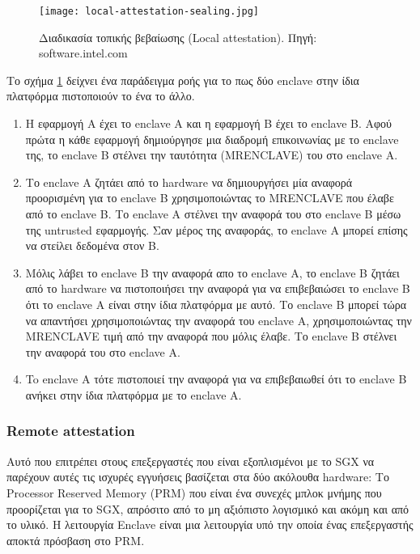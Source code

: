 \begin{figure}[H]
\centering
  \texttt{[image: local-attestation-sealing.jpg]}
  \caption{Διαδικασία τοπικής βεβαίωσης (Local attestation). Πηγή: software.intel.com }
  \label{fig:runtime_localattestation}
\end{figure}

Το σχήμα \ref{fig:runtime_localattestation} δείχνει ένα παράδειγμα ροής για το πως δύο enclave στην ίδια πλατφόρμα πιστοποιούν το ένα το άλλο. 
\begin{enumerate}
   \item Η εφαρμογή Α έχει το enclave A και η εφαρμογή Β έχει το enclave B. Αφού πρώτα η κάθε εφαρμογή δημιούργησε μια διαδρομή επικοινωνίας με το enclave της, το enclave B στέλνει την ταυτότητα (MRENCLAVE) του στο enclave A.
   \item Το enclave A ζητάει από το hardware να δημιουργήσει μία αναφορά προορισμένη για το enclave B χρησιμοποιώντας το MRENCLAVE που έλαβε από το enclave Β. Το enclave A στέλνει την αναφορά του στο enclave Β μέσω της untrusted εφαρμογής. Σαν μέρος της αναφοράς, το enclave Α μπορεί επίσης να στείλει δεδομένα στον Β.
\item Μόλις λάβει το enclave Β την αναφορά απο το enclave Α, το enclave Β ζητάει από το hardware να πιστοποιήσει την αναφορά για να επιβεβαιώσει το enclave Β ότι το enclave Α είναι στην ίδια πλατφόρμα με αυτό. Το enclave Β μπορεί τώρα να απαντήσει χρησιμοποιώντας την αναφορά του enclave Α, χρησιμοποιώντας την MRENCLAVE τιμή από την αναφορά που μόλις έλαβε. Το enclave B στέλνει την αναφορά του στο enclave A.
\item To enclave A τότε πιστοποιεί την αναφορά για να επιβεβαιωθεί ότι το enclave Β ανήκει στην ίδια πλατφόρμα με το enclave Α.

 \end{enumerate}


\subsubsection{Remote attestation}

Αυτό που επιτρέπει στους επεξεργαστές που είναι εξοπλισμένοι με το SGX να παρέχουν αυτές τις ισχυρές εγγυήσεις βασίζεται στα δύο ακόλουθα hardware: Το Processor Reserved Memory (PRM) που είναι ένα συνεχές μπλοκ μνήμης που προορίζεται για το SGX, απρόσιτο από το μη αξιόπιστο λογισμικό και ακόμη και από το υλικό. Η λειτουργία Enclave είναι μια λειτουργία υπό την οποία ένας επεξεργαστής αποκτά πρόσβαση στο PRM.

